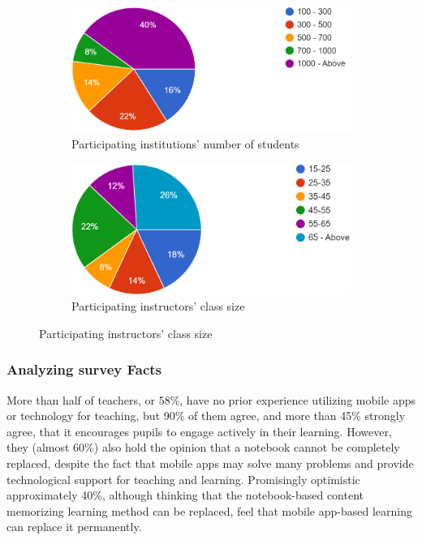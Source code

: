 \documentclass[sn-mathphys,Numbered]{sn-jnl}%
\theoremstyle{thmstyleone}%
\theoremstyle{thmstyletwo}%
\theoremstyle{thmstylethree}%
\begin{document}
\begin{figure}[h!]
\centering
\begin{subfigure}{0.48\textwidth}
    \includegraphics[width=\textwidth]{num_stu.png}
    \caption{Participating institutions' number of students}
    \label{cv}
\end{subfigure}
\hfill
\begin{subfigure}{0.48\textwidth}
    \includegraphics[width=\textwidth]{class_size.png}
    \caption{Participating instructors' class size}
    \label{umass}
\end{subfigure}       
\label{cv_umass}
\end{figure}

\subsubsection{Analyzing survey Facts} 
More than half of teachers, or 58\%, have no prior experience utilizing mobile apps or technology for teaching, but 90\% of them agree, and more than 45\% strongly agree, that it encourages pupils to engage actively in their learning. However, they (almost 60\%) also hold the opinion that a notebook cannot be completely replaced, despite the fact that mobile apps may solve many problems and provide technological support for teaching and learning. Promisingly optimistic approximately 40\%, although thinking that the notebook-based content memorizing learning method can be replaced, feel that mobile app-based learning can replace it permanently. 
\end{document}
